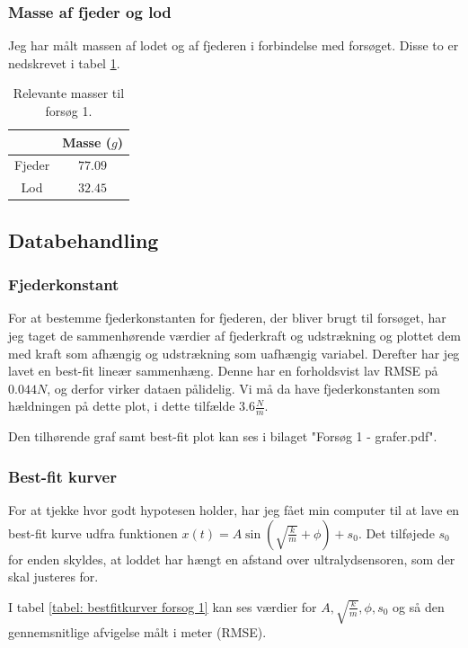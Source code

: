\subsubsection{Masse af fjeder og lod}\label{exp1: Masse af fjeder og lod}
Jeg har målt massen af lodet og af fjederen i forbindelse med forsøget. 
Disse to er nedskrevet i tabel \ref{tabel: Masser forsog 1}.
\pagebreak
\begin{table}[h]
\centering
\begin{tabular}{|c|c|}
\hline 
 & Masse ($g$) \\ 
\hline 
Fjeder & $77.09$ \\ 
\hline 
Lod & $32.45$ \\ 
\hline 
\end{tabular} 
\caption{Relevante masser til forsøg 1.}
\label{tabel: Masser forsog 1}
\end{table}

\subsection{Databehandling}\label{exp1: databehandling afsnit}
\subsubsection{Fjederkonstant}\label{databehandling: tyk fjeder fjederkonstant}
For at bestemme fjederkonstanten for fjederen, der bliver brugt til forsøget, har jeg taget de sammenhørende værdier af fjederkraft og udstrækning og plottet dem med kraft som afhængig og udstrækning som uafhængig variabel. 
Derefter har jeg lavet en best-fit lineær sammenhæng. 
Denne har en forholdsvist lav RMSE på $0.044N$, og derfor virker dataen pålidelig. 
Vi må da have fjederkonstanten som hældningen på dette plot, i dette tilfælde $3.6\frac{N}{m}$.

Den tilhørende graf samt best-fit plot kan ses i bilaget "Forsøg 1 - grafer.pdf". 
 

\subsubsection{Best-fit kurver}\label{exp1: Best-fit kurver}
For at tjekke hvor godt hypotesen holder, har jeg fået min computer til at lave en best-fit kurve udfra funktionen $x(t)=A\sin (\sqrt{\frac{k}{m}}+\phi) + s_0$.
Det tilføjede $s_0$ for enden skyldes, at loddet har hængt en afstand over ultralydsensoren, som der skal justeres for. 

I tabel \ref{tabel: bestfitkurver forsog 1} kan ses værdier for $A, \sqrt{\frac{k}{m}}, \phi ,s_0$ og så den gennemsnitlige afvigelse målt i meter (RMSE).


